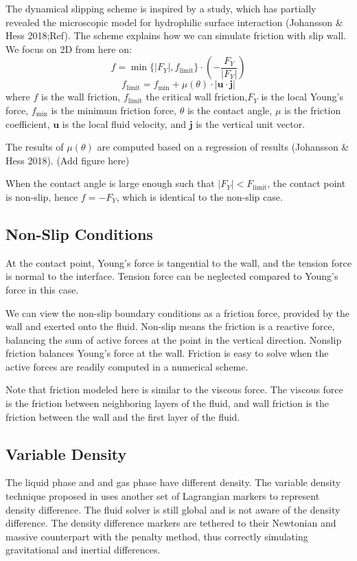 \documentclass{jfm}
\begin{document}
The dynamical slipping scheme is inspired by a study, which has partially revealed the microscopic model for hydrophilic surface interaction (Johansson \& Hess 2018;Ref). The scheme explains how we can simulate friction with slip wall. We focus on 2D from here on:
\begin{equation}
    f=\min\{|F_Y|,f_\text{limit}\}\cdot\left(-\frac{F_Y}{|F_Y|}\right)
\end{equation}
\begin{equation}
    f_\text{limit}=f_{\min}+\mu(\theta)\cdot|\boldsymbol{u}\cdot\boldsymbol{j}|
\end{equation}
where $f$ is the wall friction, $f_\text{limit}$ the critical wall friction,$F_Y$ is the local Young's force, $f_{\min}$ is the minimum friction force, $\theta$ is the contact angle, $\mu$ is the friction coefficient, $\boldsymbol{u}$ is the local fluid velocity, and $\boldsymbol{j}$ is the vertical unit vector.

The results of $\mu(\theta)$ are computed based on a regression of results (Johansson \& Hess 2018). (Add figure here)

When the contact angle is large enough such that $|F_Y|<F_\text{limit}$, the contact point is non-slip, hence $f=-F_Y$, which is identical to the non-slip case.

\subsection{Non-Slip Conditions}
At the contact point, Young's force is tangential to the wall, and the tension force is normal to the interface. Tension force can be neglected compared to Young's force in this case.

We can view the non-slip boundary conditions as a friction force, provided by the wall and exerted onto the fluid. Non-slip means the friction is a reactive force, balancing the sum of active forces at the point in the vertical direction. Nonslip friction balances Young's force at the wall. Friction is easy to solve when the active forces are readily computed in a numerical scheme.

Note that friction modeled here is similar to the viscous force. The viscous force is the friction between neighboring layers of the fluid, and wall friction is the friction between the wall and the first layer of the fluid.

\subsection{Variable Density}
The liquid phase and and gas phase have different density. The variable density technique proposed in \cite{IBM_variable_density} uses another set of Lagrangian markers to represent density difference. The fluid solver is still global and is not aware of the density difference. The density difference markers are tethered to their Newtonian and massive counterpart with the penalty method, thus correctly simulating gravitational and inertial differences.
\end{document}

